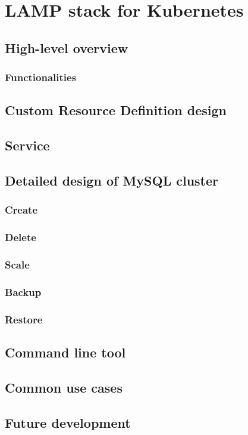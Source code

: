\chapter{LAMP stack for Kubernetes}
\section{High-level overview}
\subsection{Functionalities}

\section{Custom Resource Definition design}

\section{Service}

\section{Detailed design of MySQL cluster}
\subsection{Create}
\subsection{Delete}
\subsection{Scale}
\subsection{Backup}
\subsection{Restore}


\section{Command line tool}

\section{Common use cases}

\section{Future development}
